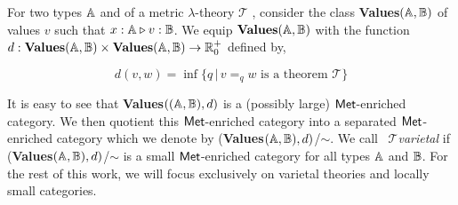 \documentclass[10pt,a4paper]{amsart}
\theoremstyle{definition}
\theoremstyle{definition}
\theoremstyle{definition}
\theoremstyle{definition}
\theoremstyle{definition}
\theoremstyle{definition}
\begin{document}
For two types $\mathbb{A}$ and of a metric $\lambda$-theory $\mathscr{T}$ , consider the class \textbf{Values}$(\mathbb{A},\mathbb{B})$ of values $v$ such that $x : \mathbb{A} \triangleright v : \mathbb{B}$. We equip $\textbf{Values}(\mathbb{A},\mathbb{B})$ with the function $d :\textbf{Values}(\mathbb{A},\mathbb{B}) \times \textbf{Values}(\mathbb{A},\mathbb{B}) \rightarrow \mathbb{R}^{+}_0$ defined by,

$$d(v,w)=\inf{\{q \, \vert \, v=_q w \text{ is a theorem } \mathscr{T} \}}$$


It is easy to see that \textbf{Values}$((\mathbb{A},\mathbb{B}),d)$ is a (possibly large)  $\mathsf{Met}$-enriched category. We then quotient this  $\mathsf{Met}$-enriched category into a separated  $\mathsf{Met}$-enriched category which we denote by (\textbf{Values}$(\mathbb{A},\mathbb{B}),d)$/$\sim$. We call  $\mathscr{T} $\emph{varietal} if (\textbf{Values}$(\mathbb{A},\mathbb{B}),d)$/$\sim$ is a small  $\mathsf{Met}$-enriched category for all types $\mathbb{A}$ and $\mathbb{B}$. For the rest of this work, we will focus exclusively on varietal theories and locally small categories.
\end{document}
